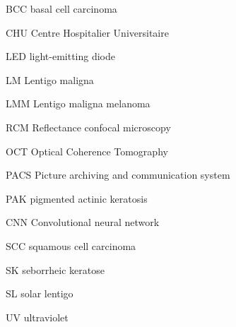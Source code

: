 
            {BCC}
            {basal cell carcinoma}
            
            {CHU}
            {Centre Hospitalier Universitaire}
            
            {LED}
            {light-emitting diode}
            
            {LM}
            {Lentigo maligna}
            
            {LMM}
            {Lentigo maligna melanoma}
            
            {RCM}
            {Reflectance confocal microscopy}

            {OCT}
            {Optical Coherence Tomography}
            
            {PACS}
            {Picture archiving and communication system}
         
            {PAK}
            {pigmented actinic keratosis}
            
            {CNN}
            {Convolutional neural network}
            
            {SCC}
            {squamous cell carcinoma}
            
            {SK}
            {seborrheic keratose}
            
            {SL}
            {solar lentigo}
            
            {UV}
            {ultraviolet}
